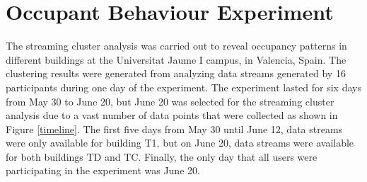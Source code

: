 




\newpage
\section{Occupant Behaviour Experiment}
The streaming cluster analysis was carried out to reveal occupancy patterns in different buildings at the Universitat Jaume I campus, in Valencia, Spain. The clustering results were generated from analyzing data streams generated by 16 participants during one day of the experiment. The experiment lasted for six days from May 30 to June 20, but June 20 was selected for the streaming cluster analysis due to a vast number of data points that were collected as shown in Figure \ref{timeline}. The first five days from May 30 until June 12, data streams were only available for building T1, but on June 20, data streams were available for both buildings TD and TC. Finally, the only day that all users were participating in the experiment was June 20.


